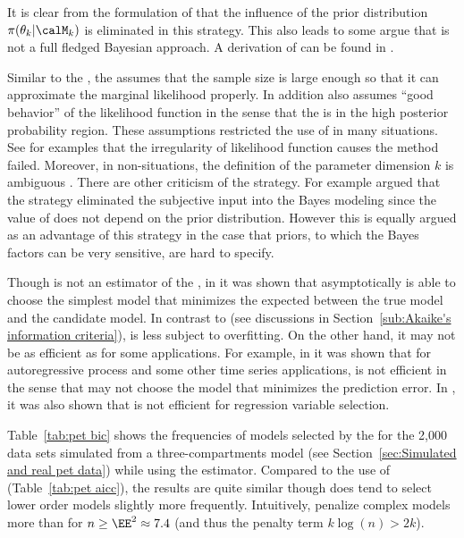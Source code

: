 It is clear from the formulation of \bic that the influence of the prior
distribution $\pi(\theta_k|\calM_k)$ is eliminated in this strategy. This also
leads to some argue that \bic is not a full fledged Bayesian approach. A
derivation of \bic can be found in \cite[][sec.~3.2]{Claeskens:2008tq}.

Similar to the \aic, the \bic assumes that the sample size is large enough so
that it can approximate the marginal likelihood properly. In addition \bic
also assumes ``good behavior'' of the likelihood function in the sense that
the \mle is in the high posterior probability region. These assumptions
restricted the use of \bic in many situations. See \cite{Berger:2001uy} for
examples that the irregularity of likelihood function causes the \bic method
failed. Moreover, in non-\iid situations, the definition of the parameter
dimension $k$ is ambiguous \cite{Spiegelhalter:1998uc, Kass:1995vb}. There are
other criticism of the \bic strategy. For example
\cite[][sec.~7.2.3]{Robert:2007tc} argued that the \bic strategy eliminated
the subjective input into the Bayes modeling since the value of \bic does not
depend on the prior distribution. However this is equally argued as an
advantage of this strategy in the case that priors, to which the Bayes factors
can be very sensitive, are hard to specify.

Though \bic is not an estimator of the \kld, in \cite{Sin:1996vs} it was shown
that asymptotically \bic is able to choose the simplest model that minimizes
the expected \kld between the true model and the candidate model. In contrast
to \aic (see discussions in Section~\ref{sub:Akaike's information criteria}),
\bic is less subject to overfitting. On the other hand, it may not be as
efficient as \aic for some applications. For example, in \cite{Lee:2001tm} it
was shown that for autoregressive process and some other time series
applications, \bic is not efficient in the sense that \bic may not choose the
model that minimizes the prediction error. In
\cite[][sec.~4.7]{Claeskens:2008tq}, it was also shown that \bic is not
efficient for regression variable selection.

Table~\ref{tab:pet bic} shows the frequencies of models selected by the \bic
for the 2,000 \pet data sets simulated from a three-compartments model (see
Section~\ref{sec:Simulated and real pet data}) while using the \nls estimator.
Compared to the use of \aicc (Table~\ref{tab:pet aicc}), the results are quite
similar though \bic does tend to select lower order models slightly more
frequently. Intuitively, \bic penalize complex models more than \aic for
$n\ge\EE^2\approx7.4$ (and thus the penalty term $k\log(n) > 2k$).

